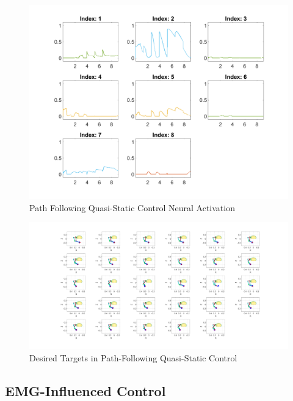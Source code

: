 \begin{figure}[h!]
\centering
\includegraphics[width=1\textwidth]{Pictures/Controller/Healthy_NA.png} 
\caption{Path Following Quasi-Static Control Neural Activation} %
\label{fig:PFNA} %
\end{figure}

\newpage
\begin{landscape} %
  \begin{figure}[h!]
    \centering
    \includegraphics[width=1.7\textwidth]{Pictures/Results/Controller/QSC29positions.png}
    \caption{Desired Targets in Path-Following Quasi-Static Control} 
  \end{figure}
\end{landscape} %

\subsection{EMG-Influenced Control}

